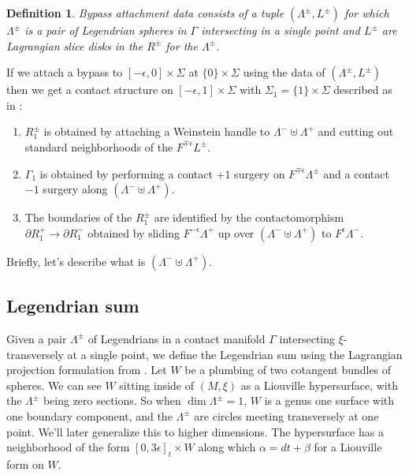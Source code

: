 \documentclass[11pt]{amsart}
\newcommand{\Leg}{\Lambda}
\newcommand{\be}{\begin{enumerate}}
\newcommand{\ee}{\end{enumerate}}
\newcommand{\Mxi}{(M,\xi)}
\newcommand{\hypersurface}{\Sigma}
\newcommand{\posRegion}{R^{+}}
\newcommand{\negRegion}{R^{-}}
\newcommand{\posNegRegion}{R^{\pm}}
\newcommand{\Lag}{L}
\newcommand{\posNegLag}{\Lag^{\pm}}
\newcommand{\posLeg}{\Leg^{+}}
\newcommand{\negLeg}{\Leg^{-}}
\newcommand{\posNegLeg}{\Leg^{\pm}}
\newcommand{\divSet}{\Gamma}
\newtheorem{defn}[thm]{Definition}
\begin{document}
\begin{defn}
Bypass attachment data consists of a tuple $(\posNegLeg, \posNegLag)$ for which $\posNegLeg$ is a pair of Legendrian spheres in $\divSet$ intersecting in a single point and $\posNegLag$ are Lagrangian slice disks in the $\posNegRegion$ for the $\posNegLeg$.
\end{defn}

If we attach a bypass to $[-\epsilon, 0] \times \hypersurface$ at $\{ 0 \} \times \hypersurface$ using the data of $(\posNegLeg, \posNegLag)$ then we get a contact structure on $[-\epsilon, 1] \times \hypersurface$ with $\hypersurface_{1} = \{1\} \times \hypersurface$ described as in \cite[Theorem 5.1.3]{HH:Bypass}:
\be
\item $\posNegRegion_{1}$ is obtained by attaching a Weinstein handle to $\negLeg \uplus \posLeg$ and cutting out standard neighborhoods of the $F^{\mp \epsilon}\posNegLag$.
\item $\divSet_{1}$ is obtained by performing a contact $+1$ surgery on $F^{\mp\epsilon}\posNegLeg$ and a contact $-1$ surgery along $(\negLeg \uplus \posLeg)$.
\item The boundaries of the $\posNegRegion_{1}$ are identified by the contactomorphism $\partial \posRegion_{1} \rightarrow \partial \negRegion_{1}$ obtained by sliding $F^{-\epsilon}\posLeg$ up over $(\negLeg \uplus \posLeg)$ to $F^{\epsilon}\negLeg$.
\ee

Briefly, let's describe what is $(\negLeg \uplus \posLeg)$.

\subsection{Legendrian sum}

Given a pair $\posNegLeg$ of Legendrians in a contact manifold $\divSet$ intersecting $\xi$-transversely at a single point, we define the Legendrian sum using the Lagrangian projection formulation from \cite[\S 4.1.2]{HH:Bypass}. Let $W$ be a plumbing of two cotangent bundles of spheres. We can see $W$ sitting inside of $\Mxi$ as a Liouville hypersurface, with the $\posNegLeg$ being zero sections. So when $\dim \posNegLeg = 1$, $W$ is a genus one surface with one boundary component, and the $\posNegLeg$ are circles meeting transversely at one point. We'll later generalize this to higher dimensions. The hypersurface has a neighborhood of the form $[0, 3\epsilon]_{t} \times W$ along which $\alpha = dt + \beta$ for a Liouville form on $W$.
\end{document}
